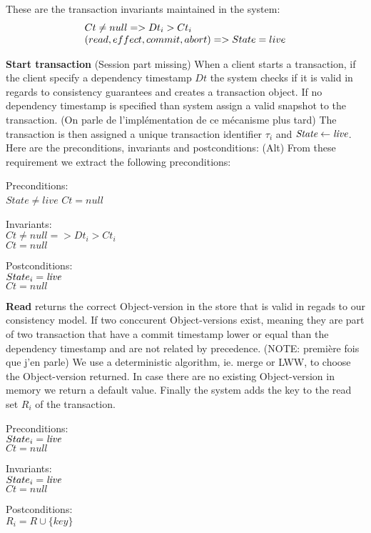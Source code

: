 \documentclass[systeme,french,english]{compas2022}
\begin{document}
These are the transaction invariants maintained in the system:
\[
  \begin{array}{lcl}
    \emph{$Ct \neq null => Dt_i > Ct_i$}\\
    \emph{$(read, effect, commit, abort) => State = live$}
  \end{array} 
\]

\textbf{Start transaction} (Session part missing)
When a client starts a transaction, if the client specify a dependency timestamp $Dt$ the system checks if it is valid in regards to consistency guarantees and creates a transaction object.
If no dependency timestamp is specified than system assign a valid snapshot to the transaction.
(On parle de l'implémentation de ce mécanisme plus tard)
The transaction is then assigned a unique transaction identifier $\tau_i$ and $\emph{State} \leftarrow \emph{live}$.
Here are the preconditions, invariants and postconditions:
(Alt) From these requirement we extract the following preconditions:

Preconditions:\\
$State \neq live$
$Ct = null$

Invariants:\\
\emph{$Ct \neq null => Dt_i > Ct_i$}\\
$Ct = null$

Postconditions:\\
$State_i = \emph{live}$ \\
$Ct = null$


\textbf{Read} returns the correct Object-version in the store that is valid in regads to our consistency model.
If two conccurent Object-versions exist, meaning they are part of two transaction that have a commit timestamp lower or equal than the dependency timestamp and are not related by precedence.
(NOTE: première fois que j'en parle)
We use a deterministic algorithm, ie. merge or LWW, to choose the Object-version returned.
In case there are no existing Object-version in memory we return a default value.
Finally the system adds the key to the read set $R_i$ of the transaction. 

Preconditions:\\ 
$State_i = \emph{live}$ \\
$Ct = null$

Invariants:\\
$State_i = \emph{live}$ \\
$Ct = null$

Postconditions:\\
$R_i = R \cup \{key\}$ \\
\end{document}
